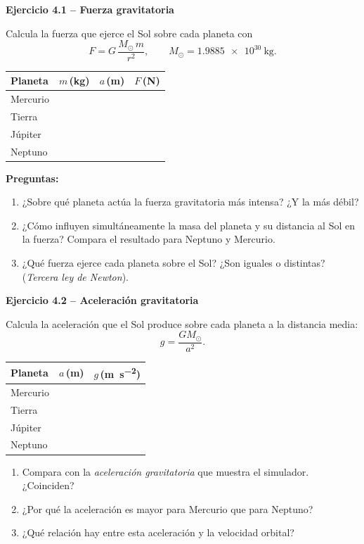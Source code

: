 \documentclass[11pt,a4paper]{article}
\newenvironment{cajaEjercicio}[1][]{\par\medskip\noindent\textbf{#1}\par\smallskip}{\par\medskip}
\theoremstyle{definition}
\newcommand{\Msun}{\ensuremath{M_{\odot}}}
\newcommand{\GMsun}{\ensuremath{GM_{\odot}}}
\begin{document}
\begin{cajaEjercicio}[Ejercicio 4.1 -- Fuerza gravitatoria]
Calcula la fuerza que ejerce el Sol sobre cada planeta con
\[
  F = G\,\frac{\Msun\, m}{r^{2}}, \qquad
  \Msun = \SI{1.9885e30}{\kilo\gram}.
\]

\begin{center}
\begin{tabular}{@{}lccc@{}}
\toprule
\textbf{Planeta} & $m$\,(\si{\kilo\gram}) & $a$\,(\si{\metre}) & $F$\,(\si{\newton}) \\
\midrule
Mercurio & & & \\
Tierra   & & & \\
Júpiter  & & & \\
Neptuno  & & & \\
\bottomrule
\end{tabular}
\end{center}

\textbf{Preguntas:}
\begin{enumerate}[label=\alph*),leftmargin=*]
  \item ¿Sobre qué planeta actúa la fuerza gravitatoria más intensa? ¿Y la más débil?
  \item ¿Cómo influyen simultáneamente la masa del planeta y su distancia al Sol en la fuerza? Compara el resultado para Neptuno y Mercurio.
  \item ¿Qué fuerza ejerce cada planeta sobre el Sol? ¿Son iguales o distintas? (\emph{Tercera ley de Newton}).
\end{enumerate}
\end{cajaEjercicio}

\begin{cajaEjercicio}[Ejercicio 4.2 -- Aceleración gravitatoria]
Calcula la aceleración que el Sol produce sobre cada planeta a la distancia media:
\[
  g = \frac{\GMsun}{a^{2}}.
\]
\begin{center}
\begin{tabular}{@{}lcc@{}}
\toprule
\textbf{Planeta} & $a$\,(\si{\metre}) & $g$\,(\si{\metre\per\square\second}) \\
\midrule
Mercurio & & \\
Tierra   & & \\
Júpiter  & & \\
Neptuno  & & \\
\bottomrule
\end{tabular}
\end{center}

\begin{enumerate}[label=\alph*),leftmargin=*]
  \item Compara con la \emph{aceleración gravitatoria} que muestra el simulador. ¿Coinciden?
  \item ¿Por qué la aceleración es mayor para Mercurio que para Neptuno?
  \item ¿Qué relación hay entre esta aceleración y la velocidad orbital?
\end{enumerate}
\end{cajaEjercicio}
\end{document}
